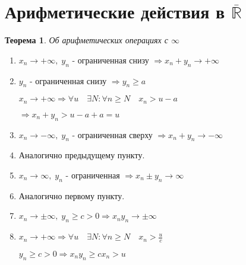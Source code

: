 \documentclass[12pt,letterpaper]{report}
\makeatletter
\newtheorem{theorem}{Теорема}
\renewenvironment{proof}[1][\proofname]{%
   \par\pushQED{\qed}\normalfont%
   \topsep6\p@\@plus6\p@\relax
   \trivlist\item[\hskip\labelsep\bfseries#1\@addpunct{.}]%
   \ignorespaces
}{%
   \popQED\endtrivlist\@endpefalse
}
\makeatother
\begin{document}
\section{Арифметические действия в $\overline{\mathbb{R}}$}
\begin{theorem} Об арифметических операциях с $\infty$ \end{theorem}
\begin{enumerate}
    \item $x_n \to +\infty,\; y_n$ - ограниченная снизу $\Rightarrow x_n + y_n \to +\infty$
    \begin{proof}
        $y_n$ - ограниченная снизу $\Rightarrow y_n \geqslant a$ 
        
        $x_n \to +\infty \Rightarrow \forall u \quad \exists N: \forall n \geqslant N \quad x_n > u - a$ 
        
        $\Rightarrow x_n + y_n > u - a + a = u$
    \end{proof}
    \item $x_n \to -\infty,\; y_n$ - ограниченная сверху $\Rightarrow x_n + y_n \to -\infty$
    \begin{proof}
        Аналогично предыдущему пункту.
    \end{proof}
    \item $x_n \to \infty,\; y_n$ - ограниченная $\Rightarrow x_n \pm y_n \to \infty$
    \begin{proof}
        Аналогично первому пункту.
    \end{proof}
    \item $x_n \to \pm \infty,\; y_n \geqslant c > 0 \Rightarrow x_ny_n \to \pm \infty$
    \begin{proof}
        $x_n \to +\infty \Rightarrow \forall u \quad \exists N: \forall n \geqslant N \quad x_n>\frac{u}{c}$
        
        $y_n \geqslant c > 0 \Rightarrow x_ny_n \geqslant cx_n > u$
        

\end{proof}
\end{enumerate}
\end{document}
